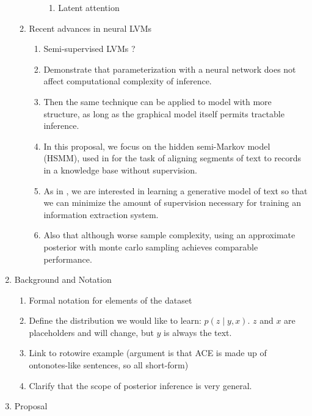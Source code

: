 \documentclass[12pt]{article}
\begin{document}
\begin{enumerate}
\begin{enumerate}
\begin{enumerate}
\begin{enumerate}
            \item Latent attention \citet{deng2018attn}
            \end{enumerate}
        \end{enumerate}
    \item Recent advances in neural LVMs
        \begin{enumerate}
        \item Semi-supervised LVMs \citet{kingma2014ssvae}?
        \item Demonstrate that parameterization with a neural network does not affect computational
            complexity of inference.
        \item Then the same technique can be applied to model with more structure,
            as long as the graphical model itself permits tractable inference.
        \item In this proposal, we focus on the hidden semi-Markov model (HSMM),
            used in \citet{liang2009semalign} for the task of aligning segments of text to
            records in a knowledge base without supervision. 
        \item As in \citet{liang2009semalign}, we are interested in learning a generative model of text so that
            we can minimize the amount of supervision necessary for training an
            information extraction system.
        \item Also that although worse sample complexity, using an approximate posterior
            with monte carlo sampling achieves comparable performance.
        \end{enumerate}
    \end{enumerate}
\item Background and Notation
    \begin{enumerate}
    \item Formal notation for elements of the dataset
    \item Define the distribution we would like to learn: $p(z\mid y, x)$.
        $z$ and $x$ are placeholders and will change, but $y$ is always the text.
    \item Link to rotowire example
        (argument is that ACE is made up of ontonotes-like sentences, so all short-form)
    \item Clarify that the scope of posterior inference is very general.
    \end{enumerate}
\item Proposal
    \begin{enumerate}

\end{enumerate}
\end{enumerate}
\end{document}
